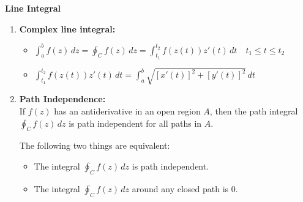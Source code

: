 \documentclass[11pt,oneside,openright,numbers=noenddot]{scrbook}
\begin{document}
\noindent \textbf{\Large Line Integral}
\begin{enumerate}
    \item \textbf{Complex line integral:}
    \begin{itemize}
        \item $ \displaystyle\int_a^b f(z) \, dz = \oint_C f(z) \, dz = \int_{t_1}^{t_2} f(z(t)) z'(t) \, dt \quad t_1 \leq t \leq t_2$
    \item  $\displaystyle \int_{t_1}^{t_2} f(z(t)) z'(t) \, dt = \int_a^b \sqrt{[x'(t)]^2 + [y'(t)]^2} \, dt$
    
    \end{itemize}
    
    \item \textbf{Path Independence:}\\
    If \( f(z) \) has an antiderivative in an open region \(A\), then the path integral \(\displaystyle \oint_C f(z) \, dz \) is path independent for all paths in \(A\).
    
    The following two things are equivalent:
    \begin{itemize}
        \item The integral \(\displaystyle  \oint_C f(z) \, dz \) is path independent.
        \item The integral \(\displaystyle  \oint_C f(z) \, dz \) around any closed path is 0.
    \end{itemize}
\end{enumerate}

\backmatter
\end{document}
